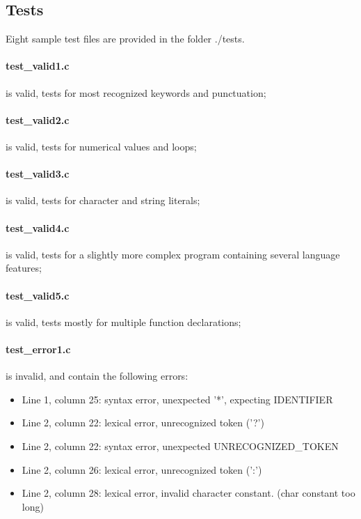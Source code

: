 
\subsection{Tests}
Eight sample test files are provided in the folder ./tests.

\paragraph{test{\_}valid1.c} is valid, tests for most recognized keywords and punctuation;
\paragraph{test{\_}valid2.c} is valid, tests for numerical values and loops;
\paragraph{test{\_}valid3.c} is valid, tests for character and string literals;
\paragraph{test{\_}valid4.c} is valid, tests for a slightly more complex program containing several language features;
\paragraph{test{\_}valid5.c} is valid, tests mostly for multiple function declarations;

\paragraph{test{\_}error1.c} is invalid, and contain the following errors:
\begin{itemize}
\item Line 1, column 25: syntax error, unexpected '*', expecting IDENTIFIER
\item Line 2, column 22: lexical error, unrecognized token ('?')
\item Line 2, column 22: syntax error, unexpected UNRECOGNIZED\_TOKEN
\item Line 2, column 26: lexical error, unrecognized token (':')
\item Line 2, column 28: lexical error, invalid character constant. (char constant too long)
\end{itemize}

